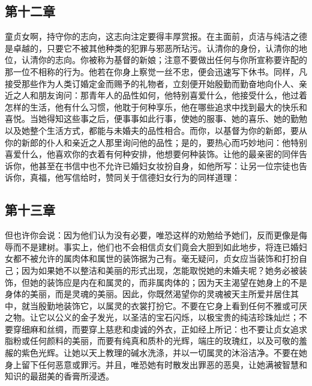 \subsection{第十二章}

童贞女啊，持守你的志向，这志向注定要得丰厚赏报。在主面前，贞洁与纯洁之德是卓越的，只要它不被其他种类的犯罪与邪恶所玷污。认清你的身份，认清你的地位，认清你的志向。你被称为基督的新娘；注意不要做出任何与你所宣称要许配的那一位不相称的行为。他若在你身上察觉一丝不忠，便会迅速写下休书。同样，凡接受那些作为人类订婚定金而赐予的礼物者，立刻便开始殷勤而勤奋地向仆人、亲近之人和朋友询问：那青年人的品性如何，他特别喜爱什么，他接受什么，他过着怎样的生活，他有什么习惯，他耽于何种享乐，他在哪些追求中找到最大的快乐和喜悦。当她得知这些事之后，便事事如此行事，使她的服事、她的喜乐、她的勤勉以及她整个生活方式，都能与未婚夫的品性相合。而你，以基督为你的新郎，要从你的新郎的仆人和亲近之人那里询问他的品性；是的，要热心而巧妙地问：他特别喜爱什么，他喜欢你的衣着有何种安排，他想要何种装饰。让他的最亲密的同伴告诉你，他甚至在书信中也不允许已婚妇女妆扮自身，如他所写：让另一位宗徒也告诉你，真福，他写信给时，赞同关于信德妇女行为的同样道理：\par


\subsection{第十三章}

但也许你会说：因为他们认为没有必要，唯恐这样的劝勉给予她们，反而更像是侮辱而不是建树。事实上，他们也不会相信贞女们竟会大胆到如此地步，将连已婚妇女都不被允许的属肉体和属世的装饰据为己有。毫无疑问，贞女应当装饰和打扮自己；因为如果她不以整洁和美丽的形式出现，怎能取悦她的未婚夫呢？她务必被装饰，但她的装饰应是内在和属灵的，而非属肉体的；因为天主渴望在她身上的不是身体的美丽，而是灵魂的美丽。因此，你既然渴望你的灵魂被天主所爱并居住其中，就当殷勤地装饰它，以属灵的衣裳打扮它。不要在它身上看到任何不雅或可厌之物。让它以公义的金子发光，以圣洁的宝石闪烁，以极宝贵的纯洁珍珠灿烂；不要穿细麻和丝绸，而要穿上慈悲和虔诚的外衣，正如经上所记：也不要让贞女追求脂粉或任何颜料的美丽，而要有纯真和质朴的光辉，端庄的玫瑰红，以及可敬的羞赧的紫色光辉。让她以天上教理的碱水洗涤，并以一切属灵的沐浴洁净。不要在她身上留下任何恶意或罪污。并且，唯恐她有时散发出罪恶的恶臭，让她满被智慧和知识的最甜美的香膏所浸透。\par


